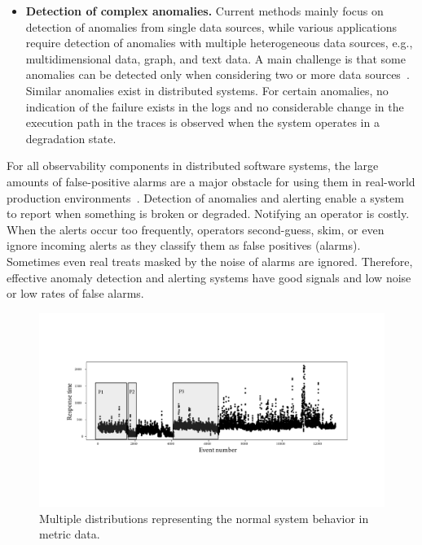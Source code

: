\begin{itemize}
    \item \textbf{Detection of complex anomalies.} Current methods mainly focus on detection of anomalies from single data sources, while various applications require detection of anomalies with multiple heterogeneous data sources, e.g., multidimensional data, graph, and text data. A main challenge is that some anomalies can be detected only when considering two or more data sources~\cite{pang2020deep}. Similar anomalies exist in distributed systems. For certain anomalies, no indication of the failure exists in the logs and no considerable change in the execution path in the traces is observed when the system operates in a degradation state. 
\end{itemize} 

For all observability components in distributed software systems, the large amounts of false-positive alarms are a major obstacle for using them in real-world production environments~\cite{meng2019loganomaly}. Detection of anomalies and alerting enable a system to report when something is broken or degraded. Notifying an operator is costly. When the alerts occur too frequently, operators second-guess, skim, or even ignore incoming alerts as they classify them as false positives (alarms). Sometimes even real treats masked by the noise of alarms are ignored. Therefore, effective anomaly detection and alerting systems have good signals and low noise or low rates of false alarms.

\begin{figure}[!t]
     \centering
     \includegraphics[width=1.0\textwidth]{gfx/chap3/multipledistributions.pdf}
     \caption{Multiple distributions representing the normal system behavior in metric data.}
     \label{fig:multipledistributions}
\end{figure}

